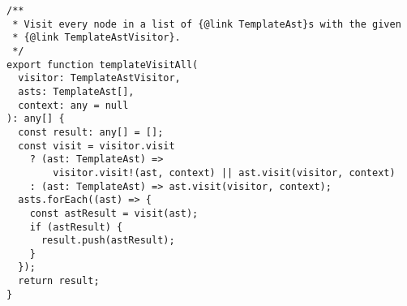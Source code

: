 \begin{verbatim}
/**
 * Visit every node in a list of {@link TemplateAst}s with the given
 * {@link TemplateAstVisitor}.
 */
export function templateVisitAll(
  visitor: TemplateAstVisitor,
  asts: TemplateAst[],
  context: any = null
): any[] {
  const result: any[] = [];
  const visit = visitor.visit
    ? (ast: TemplateAst) =>
        visitor.visit!(ast, context) || ast.visit(visitor, context)
    : (ast: TemplateAst) => ast.visit(visitor, context);
  asts.forEach((ast) => {
    const astResult = visit(ast);
    if (astResult) {
      result.push(astResult);
    }
  });
  return result;
}
\end{verbatim}
